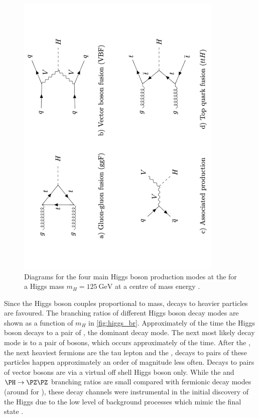 \begin{figure}[!htbp]
  \centering
  \includegraphics[angle=-90,width=0.88\textwidth]{chapters/1.theory/figs/higgs_prod.pdf}
  \caption{
    Diagrams for the four main Higgs boson production modes at the \LHC for a Higgs mass $m_H = \SI{125}{\GeV}$ at a centre of mass energy .
  }
  \label{fig:higgs_prod}
\end{figure}

Since the Higgs boson couples proportional to mass, decays to heavier particles are favoured.
The branching ratios of different Higgs boson decay modes are shown as a function of $m_H$ in \cref{fig:higgs_br}.
Approximately  of the time the Higgs boson decays to a pair of \bquarks, the dominant decay mode.
The next most likely decay mode is to a pair of \Wboson bosons, which occurs approximately  of the time.
After the \bquark, the next heaviest fermions are the tau lepton and the \cquark, decays to pairs of these particles happen approximately an order of magnitude less often.
Decays to pairs of vector bosons are via a virtual off shell Higgs boson only.
While the \Hgammagamma and $\PH \rightarrow \Zboson \Zboson$ branching ratios are small compared with fermionic decay modes (around  for \Hgammagamma), these decay channels were instrumental in the initial discovery of the Higgs due to the low level of background processes which mimic the final state \cite{HIGG-2012-27,CMS-HIG-12-028}.

